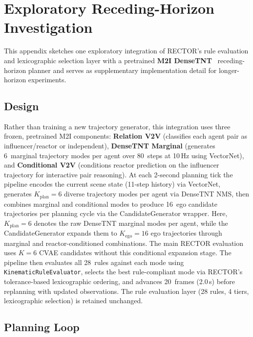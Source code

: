 \section{Exploratory Receding-Horizon Investigation}
\label{app:receding_horizon}

This appendix sketches one exploratory integration of RECTOR's rule evaluation and lexicographic selection layer with a pretrained \textbf{M2I DenseTNT}~\cite{Sun_2022} receding-horizon planner and serves as supplementary implementation detail for longer-horizon experiments.

\subsection{Design}

Rather than training a new trajectory generator, this integration uses three frozen, pretrained M2I components: \textbf{Relation V2V} (classifies each agent pair as influencer/reactor or independent), \textbf{DenseTNT Marginal} (generates 6~marginal trajectory modes per agent over 80~steps at 10\,Hz using VectorNet), and \textbf{Conditional V2V} (conditions reactor prediction on the influencer trajectory for interactive pair reasoning).  At each 2-second planning tick the pipeline encodes the current scene state (11-step history) via VectorNet, generates $K_{\text{plan}}{=}6$ diverse trajectory modes per agent via DenseTNT NMS, then combines marginal and conditional modes to produce 16~ego candidate trajectories per planning cycle via the CandidateGenerator wrapper.  Here, $K_{\text{plan}}{=}6$ denotes the raw DenseTNT marginal modes per agent, while the CandidateGenerator expands them to $K_{\text{ego}}{=}16$ ego trajectories through marginal and reactor-conditioned combinations.  The main RECTOR evaluation uses $K{=}6$ CVAE candidates without this conditional expansion stage.  The pipeline then evaluates all 28~rules against each mode using \texttt{KinematicRuleEvaluator}, selects the best rule-compliant mode via RECTOR's tolerance-based lexicographic ordering, and advances 20~frames (2.0\,s) before replanning with updated observations.  The rule evaluation layer (28 rules, 4 tiers, lexicographic selection) is retained unchanged.

\subsection{Planning Loop}

